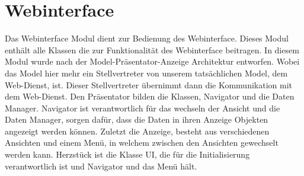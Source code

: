 \section{Webinterface}
Das Webinterface Modul dient zur Bedienung des Webinterface. Dieses Modul enthält alle Klassen die zur Funktionalität des Webinterface beitragen. In diesem Modul wurde nach der Model-Präsentator-Anzeige Architektur entworfen. Wobei das Model hier mehr ein Stellvertreter von unserem tatsächlichen Model, dem Web-Dienst, ist. Dieser Stellvertreter übernimmt dann die Kommunikation mit dem Web-Dienst. Den Präsentator bilden die Klassen, Navigator und die Daten Manager. Navigator ist verantwortlich für das wechseln der Ansicht und die Daten Manager, sorgen dafür, dass die Daten in ihren Anzeige Objekten angezeigt werden können. Zuletzt die Anzeige, besteht aus verschiedenen Ansichten und einem Menü, in welchem zwischen den Ansichten gewechselt werden kann. Herzstück ist die Klasse UI, die für die Initialisierung verantwortlich ist und Navigator und das Menü hält.
\newpage

%
%
